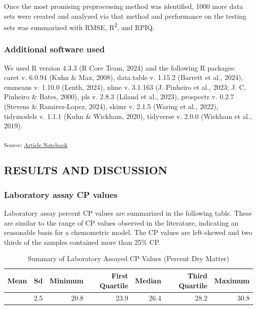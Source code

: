 \documentclass[
]{agujournal2019}
\begin{document}
Once the most promising preprocessing method was identified, 1000 more
data sets were created and analyzed via that method and performance on
the testing sets was summarized with RMSE, R\textsuperscript{2}, and
RPIQ.

\subsubsection{Additional software used}\label{additional-software-used}

We used R version 4.3.3 (R Core Team, 2024) and the following R
packages: caret v. 6.0.94 (Kuhn \& Max, 2008), data.table v. 1.15.2
(Barrett et al., 2024), emmeans v. 1.10.0 (Lenth, 2024), nlme v. 3.1.163
(J. Pinheiro et al., 2023; J. C. Pinheiro \& Bates, 2000), pls v. 2.8.3
(Liland et al., 2023), prospectr v. 0.2.7 (Stevens \& Ramirez-Lopez,
2024), skimr v. 2.1.5 (Waring et al., 2022), tidymodels v. 1.1.1 (Kuhn
\& Wickham, 2020), tidyverse v. 2.0.0 (Wickham et al., 2019).

\textsubscript{Source:
\href{https://rvcrawford.github.io/glowing-system/index.qmd.html}{Article
Notebook}}

\subsection{RESULTS AND DISCUSSION}\label{results-and-discussion}

\subsubsection{Laboratory assay CP
values}\label{laboratory-assay-cp-values}

Laboratory assay percent CP values are summarized in the following
table. These are similar to the range of CP values observed in the
literature, indicating an reasonable basis for a chemometric model. The
CP values are left-skewed and two thirds of the samples contained more
than 25\% CP.

\begin{longtable}[]{@{}rrrrrrr@{}}

\caption{\label{tbl-lab-protein-vals}Summary of Laboratory Assayed CP
Values (Percent Dry Matter)}

\tabularnewline

\toprule\noalign{}
Mean & Sd & Minimum & First Quartile & Median & Third Quartile &
Maximum \\
\midrule\noalign{}
\endhead
\bottomrule\noalign{}
\endlastfoot
26.1 & 2.5 & 20.8 & 23.9 & 26.4 & 28.2 & 30.8 \\

\end{longtable}
\end{document}
